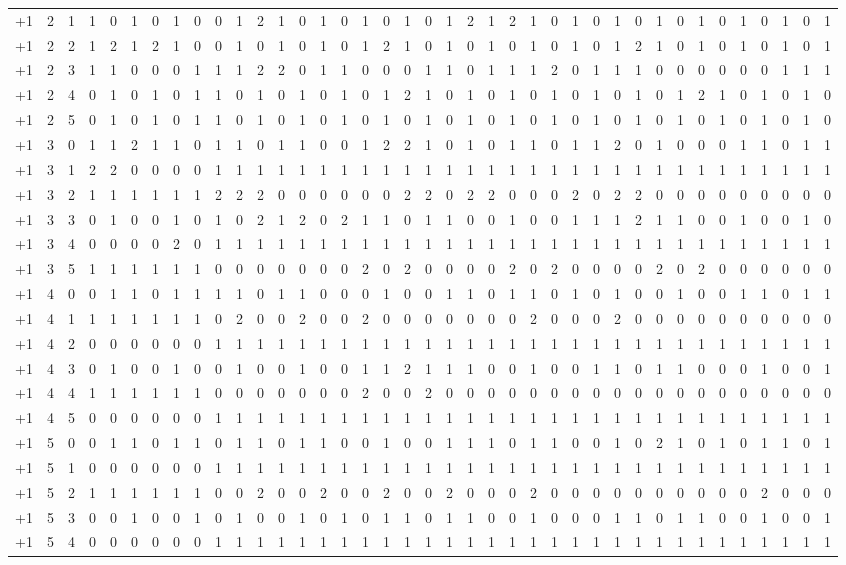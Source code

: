 {\begin{longtable}{rrr|rrrrrr|rrrrrr|rrrrrr|rrrrrr|rrrrrr|rrrrrr}
+1&2&1&1&0&1&0&1&0&0&1&2&1&0&1&0&1&0&1&0&1&2&1&2&1&0&1&0&1&0&1&0&1&0&1&0&1&0&1\\
+1&2&2&1&2&1&2&1&0&0&1&0&1&0&1&0&1&2&1&0&1&0&1&0&1&0&1&0&1&2&1&0&1&0&1&0&1&0&1\\
+1&2&3&1&1&0&0&0&1&1&1&2&2&0&1&1&0&0&0&1&1&0&1&1&1&2&0&1&1&1&0&0&0&0&0&0&1&1&1\\
+1&2&4&0&1&0&1&0&1&1&0&1&0&1&0&1&0&1&2&1&0&1&0&1&0&1&0&1&0&1&0&1&2&1&0&1&0&1&0\\
+1&2&5&0&1&0&1&0&1&1&0&1&0&1&0&1&0&1&0&1&0&1&0&1&0&1&0&1&0&1&0&1&0&1&0&1&0&1&0\\
+1&3&0&1&1&2&1&1&0&1&1&0&1&1&0&0&1&2&2&1&0&1&0&1&1&0&1&1&2&0&1&0&0&0&1&1&0&1&1\\
+1&3&1&2&2&0&0&0&0&1&1&1&1&1&1&1&1&1&1&1&1&1&1&1&1&1&1&1&1&1&1&1&1&1&1&1&1&1&1\\
+1&3&2&1&1&1&1&1&1&2&2&2&0&0&0&0&0&0&2&2&0&2&2&0&0&0&2&0&2&2&0&0&0&0&0&0&0&0&0\\
+1&3&3&0&1&0&0&1&0&1&0&2&1&2&0&2&1&1&0&1&1&0&0&1&0&0&1&1&1&2&1&1&0&0&1&0&0&1&0\\
+1&3&4&0&0&0&0&2&0&1&1&1&1&1&1&1&1&1&1&1&1&1&1&1&1&1&1&1&1&1&1&1&1&1&1&1&1&1&1\\
+1&3&5&1&1&1&1&1&1&0&0&0&0&0&0&0&2&0&2&0&0&0&0&2&0&2&0&0&0&0&2&0&2&0&0&0&0&0&0\\
+1&4&0&0&1&1&0&1&1&1&1&0&1&1&0&0&0&1&0&0&1&1&0&1&1&0&1&0&1&0&0&1&0&0&1&1&0&1&1\\
+1&4&1&1&1&1&1&1&1&0&2&0&0&2&0&0&2&0&0&0&0&0&0&0&2&0&0&0&2&0&0&0&0&0&0&0&0&0&0\\
+1&4&2&0&0&0&0&0&0&1&1&1&1&1&1&1&1&1&1&1&1&1&1&1&1&1&1&1&1&1&1&1&1&1&1&1&1&1&1\\
+1&4&3&0&1&0&0&1&0&0&1&0&0&1&0&0&1&1&2&1&1&1&0&0&1&0&0&1&1&0&1&1&0&0&0&1&0&0&1\\
+1&4&4&1&1&1&1&1&1&0&0&0&0&0&0&0&2&0&0&2&0&0&0&0&0&0&0&0&0&0&0&0&0&0&0&0&0&0&0\\
+1&4&5&0&0&0&0&0&0&1&1&1&1&1&1&1&1&1&1&1&1&1&1&1&1&1&1&1&1&1&1&1&1&1&1&1&1&1&1\\
+1&5&0&0&1&1&0&1&1&0&1&1&0&1&1&0&0&1&0&0&1&1&1&0&1&1&0&0&1&0&2&1&0&1&0&1&1&0&1\\
+1&5&1&0&0&0&0&0&0&1&1&1&1&1&1&1&1&1&1&1&1&1&1&1&1&1&1&1&1&1&1&1&1&1&1&1&1&1&1\\
+1&5&2&1&1&1&1&1&1&0&0&2&0&0&2&0&0&2&0&0&2&0&0&0&2&0&0&0&0&0&0&0&0&0&0&2&0&0&0\\
+1&5&3&0&0&1&0&0&1&0&1&0&0&1&0&1&0&1&1&0&1&1&0&0&1&0&0&0&1&1&0&1&1&0&0&1&0&0&1\\
+1&5&4&0&0&0&0&0&0&1&1&1&1&1&1&1&1&1&1&1&1&1&1&1&1&1&1&1&1&1&1&1&1&1&1&1&1&1&1\\

\end{longtable}}
